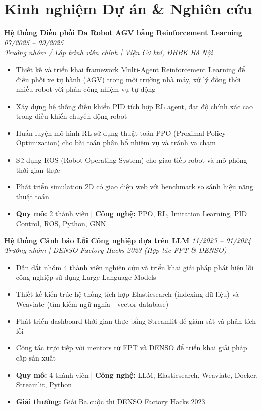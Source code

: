 \documentclass[11pt,a4paper]{article}
\newcommand{\cventry}[4]{
  \noindent\textbf{#1} \hfill \textit{#2} \\
  \textit{#3} \\
  #4
  \vspace{0.4em}
}
\begin{document}
\section{Kinh nghiệm Dự án \& Nghiên cứu}

\cventry
  {\href{https://andrewhaward2310.github.io/gnn-il-ppo-paper/}{Hệ thống Điều phối Đa Robot AGV bằng Reinforcement Learning}}
  {07/2025 -- 09/2025}
  {Trưởng nhóm / Lập trình viên chính | Viện Cơ khí, ĐHBK Hà Nội}
  {
    \begin{itemize}[leftmargin=1.5em, topsep=0pt, itemsep=0.15em]
      \item Thiết kế và triển khai framework Multi-Agent Reinforcement Learning để điều phối xe tự hành (AGV) trong môi trường nhà máy, xử lý đồng thời nhiều robot với phân công nhiệm vụ tự động
      \item Xây dựng hệ thống điều khiển PID tích hợp RL agent, đạt độ chính xác cao trong điều khiển chuyển động robot
      \item Huấn luyện mô hình RL sử dụng thuật toán PPO (Proximal Policy Optimization) cho bài toán phân bổ nhiệm vụ và tránh va chạm
      \item Sử dụng ROS (Robot Operating System) cho giao tiếp robot và mô phỏng thời gian thực
      \item Phát triển simulation 2D có giao diện web với benchmark so sánh hiệu năng thuật toán
      \item \textbf{Quy mô:} 2 thành viên \quad | \quad \textbf{Công nghệ:} PPO, RL, Imitation Learning, PID Control, ROS, Python, GNN
    \end{itemize}
  }

\cventry
  {\href{https://vjst.vn/cuoc-thi-hackathon-cua-denso-va-fpt-software-co-giai-thuong-200-trieu-dong-59481.html?fbclid=IwY2xjawQTdZ9leHRuA2FlbQIxMABicmlkETFDWmpMMnZNRjF3Nlh1VWVLc3J0YwZhcHBfaWQQMjIyMDM5MTc4ODIwMDg5MgABHiY3rVz4BPDp9Aom3Gv6v9pxeaGsxfrj0OlFoTVcmg4CX-xRBPAkNeMoXjze_aem__mBXkomTfZ92Jzh9eUT30w}
  {Hệ thống Cảnh báo Lỗi Công nghiệp dựa trên LLM}}
  {11/2023 -- 01/2024}
  {Trưởng nhóm | DENSO Factory Hacks 2023 (Hợp tác FPT \& DENSO)}
  {
    \begin{itemize}[leftmargin=1.5em, topsep=0pt, itemsep=0.15em]
      \item Dẫn dắt nhóm 4 thành viên nghiên cứu và triển khai giải pháp phát hiện lỗi công nghiệp sử dụng Large Language Models
      \item Thiết kế kiến trúc hệ thống tích hợp Elasticsearch (indexing dữ liệu) và Weaviate (tìm kiếm ngữ nghĩa - vector database)
      \item Phát triển dashboard thời gian thực bằng Streamlit để giám sát và phân tích lỗi
      \item Cộng tác trực tiếp với mentors từ FPT và DENSO để triển khai giải pháp cấp sản xuất
      \item \textbf{Quy mô:} 4 thành viên \quad | \quad \textbf{Công nghệ:} LLM, Elasticsearch, Weaviate, Docker, Streamlit, Python
      \item \textbf{Giải thưởng:} Giải Ba cuộc thi DENSO Factory Hacks 2023
    \end{itemize}
  }
\end{document}
